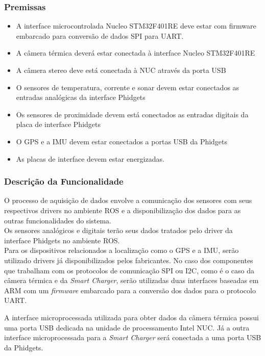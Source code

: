 \subsubsection{Premissas}
\begin{itemize}
	\item A interface microcontrolada Nucleo STM32F401RE deve estar com firmware embarcado para conversão de dados SPI para UART.
	\item A câmera térmica deverá estar conectada à interface Nucleo STM32F401RE
	\item A câmera stereo deve está conectada à NUC através da porta USB
	\item O sensores de temperatura, corrente e sonar devem estar conectados as entradas analógicas da interface Phidgets
	\item Os sensores de proximidade devem está conectados as entradas digitais da placa de interface Phidgets
	\item O GPS e a IMU devem estar conectados a portas USB da Phidgets
	\item As placas de interface devem estar energizadas.
\end{itemize}

\subsubsection{Descrição da Funcionalidade}
\indent O processo de aquisição de dados envolve a comunicação dos sensores com seus respectivos drivers no ambiente ROS e a disponibilização dos dados para as outras funcionalidades do sistema.\\
\indent Os sensores analógicos e digitais terão seus dados tratados pelo driver da interface Phidgets no ambiente ROS.\\
\indent Para os dispositivos relacionados a localização como o GPS e a IMU, serão utilizado drivers já disponibilizados pelos fabricantes.
\indent No caso dos componentes que trabalham com os protocolos de comunicação SPI ou I2C, como é o caso da câmera térmica e da \textit{Smart Charger}, serão utilizadas duas interfaces baseadas em ARM com um \textit{firmware} embarcado para a conversão dos dados para o protocolo UART.

\indent A interface microprocessada utilizada para obter dados da câmera térmica possui uma porta USB dedicada na unidade de processamento Intel NUC. Já a outra interface microprocessada para a \textit{Smart Charger} será conectada a uma porta USB da Phidgets.

